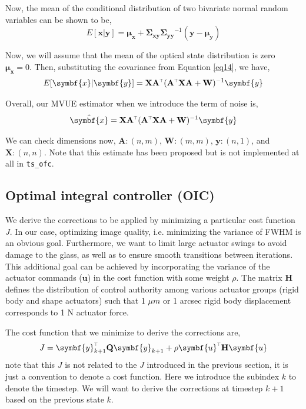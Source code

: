 \documentclass[SE,authoryear,toc]{lsstdoc}
\renewcommand{\v}[1]{\mathbf{#1}}
\newcommand{\tr}{\scalebox{0.6}{$\top$}}
\begin{document}
Now, the mean of the conditional distribution of two bivariate normal random variables can be shown to be, 
\begin{equation}
    E[\symbf{x} | \symbf{y}] = \symbf{\mu_x} + \v{\Sigma_{xy} } \v{\Sigma_{yy}}^{-1} (\symbf{y} - \symbf{\mu_y})
\end{equation}

Now, we will assume that the mean of the optical state distribution is zero $\symbf{\mu_x} = 0$. Then, substituting the covariance from Equation \ref{eq14}, we have, 
\begin{equation}
    E[\symbf{x} | \symbf{y}] = \v{X}\v{A}^{\tr}(\v{A}^{\tr}\v{X}\v{A} + \v{W})^{-1} \symbf{y}
\end{equation}

Overall, our MVUE estimator when we introduce the term of noise is, 
\begin{equation}
    \hat{\symbf{x}} = \v{X}\v{A}^{\tr}(\v{A}^{\tr}\v{X}\v{A} + \v{W})^{-1} \symbf{y}
\end{equation}

We can check dimensions now, $\v{A}: (n, m)$, $\v{W}: (m, m)$, $\symbf{y}: (n, 1)$, and $\v{X}: (n, n)$. Note that this estimate has been proposed but is not implemented at all in \texttt{ts\_ofc}.



\subsection*{Optimal integral controller (OIC)}
We derive the corrections to be applied by minimizing a particular cost function $J$. In our case, optimizing image quality, i.e. minimizing the variance of FWHM is an obvious goal. Furthermore, we want to limit large actuator swings to avoid damage to the glass, as well as to ensure smooth transitions between iterations. This additional goal can be achieved by incorporating the variance of the actuator commands ($\symbf{u}$) in the cost function with some weight $\rho$. The matrix $\v{H}$ defines the distribution of control authority among various actuator groups (rigid body and shape actuators) such that 1 $\mu m$ or 1 arcsec rigid body displacement corresponds to 1 N actuator force. 

The cost function that we minimize to derive the corrections are, 
\begin{equation}
    J = \symbf{y}_{k+1}^{\tr}\v{Q}\symbf{y}_{k+1} + \rho \symbf{u}^{\tr}\v{H}\symbf{u}
\end{equation}
note that this $J$ is not related to the $J$ introduced in the previous section, it is just a convention to denote a cost function. Here we introduce the subindex $k$ to denote the timestep. We will want to derive the corrections at timestep $k+1$ based on the previous state $k$.
\end{document}
